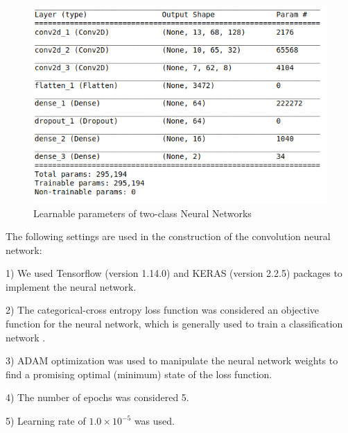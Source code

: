 \documentclass{bmcart}
\begin{document}
\begin{figure}[!h]
	\centering
	\includegraphics[scale=0.65]{ModelSelection/modelparameters.png}
	\caption{Learnable parameters of two-class Neural Networks}
	\label{paramNumber1}
\end{figure}

The following settings are used in the construction of the convolution neural network:

1) We used Tensorflow \cite{abadi2016tensorflow} (version 1.14.0) and KERAS \cite{chollet2015keras} (version 2.2.5) packages to implement the neural network.

2) The categorical-cross entropy loss function was considered an objective function for the neural network, which is generally used to train a classification network \cite{ghosal1997your, toda2012research, seen20121}.

3) ADAM optimization \cite{kingma2014adam} was used to manipulate the neural network weights to find a promising optimal (minimum) state of the loss function.

4) The number of epochs was considered 5.

5) Learning rate of $1.0 \times 10^{-5}$ was used.
\end{document}
